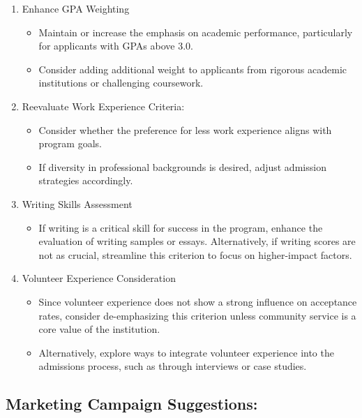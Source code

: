 \documentclass[
  letterpaper,
  DIV=11,
  numbers=noendperiod]{scrartcl}
\providecommand{\tightlist}{%
  \setlength{\itemsep}{0pt}\setlength{\parskip}{0pt}}\usepackage{longtable,booktabs,array}
\begin{document}
\begin{enumerate}
\def\labelenumi{\arabic{enumi}.}
\tightlist
\item
  Enhance GPA Weighting

  \begin{itemize}
  \tightlist
  \item
    Maintain or increase the emphasis on academic performance,
    particularly for applicants with GPAs above 3.0.
  \item
    Consider adding additional weight to applicants from rigorous
    academic institutions or challenging coursework.
  \end{itemize}
\item
  Reevaluate Work Experience Criteria:

  \begin{itemize}
  \tightlist
  \item
    Consider whether the preference for less work experience aligns with
    program goals.
  \item
    If diversity in professional backgrounds is desired, adjust
    admission strategies accordingly.
  \end{itemize}
\item
  Writing Skills Assessment

  \begin{itemize}
  \tightlist
  \item
    If writing is a critical skill for success in the program, enhance
    the evaluation of writing samples or essays. Alternatively, if
    writing scores are not as crucial, streamline this criterion to
    focus on higher-impact factors.
  \end{itemize}
\item
  Volunteer Experience Consideration

  \begin{itemize}
  \tightlist
  \item
    Since volunteer experience does not show a strong influence on
    acceptance rates, consider de-emphasizing this criterion unless
    community service is a core value of the institution.
  \item
    Alternatively, explore ways to integrate volunteer experience into
    the admissions process, such as through interviews or case studies.
  \end{itemize}
\end{enumerate}

\subsection{Marketing Campaign
Suggestions:}\label{marketing-campaign-suggestions}
\end{document}
